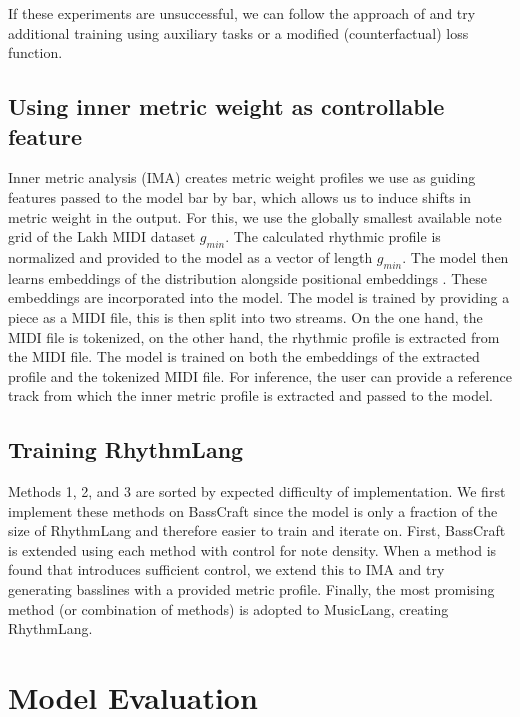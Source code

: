 If these experiments are unsuccessful, we can follow the approach of \cite{Shu_Xu_Musebarcontrol_2024} and try additional training using auxiliary tasks or a modified (counterfactual) loss function. 

\subsection{Using inner metric weight as controllable feature}
Inner metric analysis (IMA) creates metric weight profiles we use as guiding features passed to the model bar by bar, which allows us to induce shifts in metric weight in the output. 
For this, we use the globally smallest available note grid of the Lakh MIDI dataset $g_{min}$. The calculated rhythmic profile is normalized and provided to the model as a vector of length $g_{min}$. 
The model then learns embeddings of the distribution alongside positional embeddings \cite{Lin_cocomulla_2024}. These embeddings are incorporated into the model. 
The model is trained by providing a piece as a MIDI file, this is then split into two streams. On the one hand, the MIDI file is tokenized, on the other hand, the rhythmic profile is extracted from the MIDI file. The model is trained on both the embeddings of the extracted profile and the tokenized MIDI file. 
For inference, the user can provide a reference track from which the inner metric profile is extracted and passed to the model. 

\subsection{Training RhythmLang}
Methods 1, 2, and 3 are sorted by expected difficulty of implementation. We first implement these methods on BassCraft since the model is only a fraction of the size of RhythmLang and therefore easier to train and iterate on. First, BassCraft is extended using each method with control for note density. When a method is found that introduces sufficient control, we extend this to IMA and try generating basslines with a provided metric profile. Finally, the most promising method (or combination of methods) is adopted to MusicLang, creating RhythmLang.


\section{Model Evaluation}
